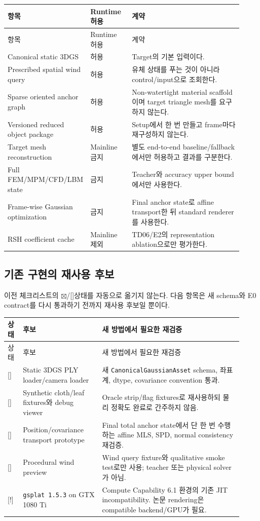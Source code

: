 \documentclass[10pt,a4paper]{article}
\newcommand{\progress}{\textcolor{ProgressBlue}{[{\raisebox{0.1ex}{\(\sim\)}}]}}
\newcommand{\done}{\textcolor{DoneGreen}{\(\boxtimes\)}}
\newcommand{\blocked}{\textcolor{BlockRed}{[!]}}
\newcommand{\code}[1]{\texttt{#1}}
\begin{document}
\begin{longtable}{L{0.23\linewidth}L{0.18\linewidth}L{0.51\linewidth}}
\toprule
항목 & Runtime 허용 & 계약 \\
\midrule
\endfirsthead
\toprule
항목 & Runtime 허용 & 계약 \\
\midrule
\endhead
Canonical static 3DGS & 허용 & Target의 기본 입력이다. \\
Prescribed spatial wind query & 허용 & 유체 상태를 푸는 것이 아니라 control/input으로 조회한다. \\
Sparse oriented anchor graph & 허용 & Non-watertight material scaffold이며 target triangle mesh를 요구하지 않는다. \\
Versioned reduced object package & 허용 & Setup에서 한 번 만들고 frame마다 재구성하지 않는다. \\
Target mesh reconstruction & Mainline 금지 & 별도 end-to-end baseline/fallback에서만 허용하고 결과를 구분한다. \\
Full FEM/MPM/CFD/LBM state & 금지 & Teacher와 accuracy upper bound에서만 사용한다. \\
Frame-wise Gaussian optimization & 금지 & Final anchor state로 affine transport한 뒤 standard renderer를 사용한다. \\
RSH coefficient cache & Mainline 제외 & TD06/E2의 representation ablation으로만 평가한다. \\
\bottomrule
\end{longtable}

\subsection{기존 구현의 재사용 후보}

이전 체크리스트의 \done/\progress 상태를 자동으로 옮기지 않는다.
다음 항목은 새 schema와 E0 contract를 다시 통과하기 전까지 재사용 후보일 뿐이다.

\begin{longtable}{L{0.06\linewidth}L{0.31\linewidth}L{0.55\linewidth}}
\toprule
상태 & 후보 & 새 방법에서 필요한 재검증 \\
\midrule
\endfirsthead
\toprule
상태 & 후보 & 새 방법에서 필요한 재검증 \\
\midrule
\endhead
\progress & Static 3DGS PLY loader/camera loader & 새 \code{CanonicalGaussianAsset} schema, 좌표계, dtype, covariance convention 통과. \\
\progress & Synthetic cloth/leaf fixtures와 debug viewer & Oracle strip/flag fixtures로 재사용하되 물리 정확도 완료로 간주하지 않음. \\
\progress & Position/covariance transport prototype & Final total anchor state에서 단 한 번 수행하는 affine MLS, SPD, normal consistency 재검증. \\
\progress & Procedural wind preview & Wind query fixture와 qualitative smoke test로만 사용; teacher 또는 physical solver가 아님. \\
\blocked & \code{gsplat 1.5.3} on GTX 1080 Ti & Compute Capability 6.1 환경의 기존 JIT incompatibility. 논문 rendering은 compatible backend/GPU가 필요. \\
\bottomrule
\end{longtable}
\end{document}
